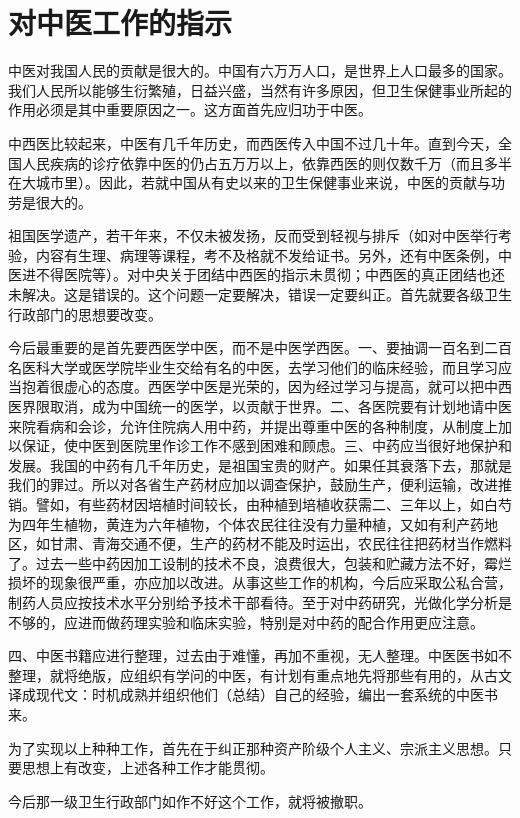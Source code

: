 \section[对中医工作的指示（一九五四年七月三十日）]{对中医工作的指示}


中医对我国人民的贡献是很大的。中国有六万万人口，是世界上人口最多的国家。我们人民所以能够生衍繁殖，日益兴盛，当然有许多原因，但卫生保健事业所起的作用必须是其中重要原因之一。这方面首先应归功于中医。

中西医比较起来，中医有几千年历史，而西医传入中国不过几十年。直到今天，全国人民疾病的诊疗依靠中医的仍占五万万以上，依靠西医的则仅数千万（而且多半在大城市里）。因此，若就中国从有史以来的卫生保健事业来说，中医的贡献与功劳是很大的。

祖国医学遗产，若干年来，不仅未被发扬，反而受到轻视与排斥（如对中医举行考验，内容有生理、病理等课程，考不及格就不发给证书。另外，还有中医条例，中医进不得医院等）。对中央关于团结中西医的指示未贯彻；中西医的真正团结也还未解决。这是错误的。这个问题一定要解决，错误一定要纠正。首先就要各级卫生行政部门的思想要改变。

今后最重要的是首先要西医学中医，而不是中医学西医。一、要抽调一百名到二百名医科大学或医学院毕业生交给有名的中医，去学习他们的临床经验，而且学习应当抱着很虚心的态度。西医学中医是光荣的，因为经过学习与提高，就可以把中西医界限取消，成为中国统一的医学，以贡献于世界。二、各医院要有计划地请中医来院看病和会诊，允许住院病人用中药，并提出尊重中医的各种制度，从制度上加以保证，使中医到医院里作诊工作不感到困难和顾虑。三、中药应当很好地保护和发展。我国的中药有几千年历史，是祖国宝贵的财产。如果任其衰落下去，那就是我们的罪过。所以对各省生产药材应加以调查保护，鼓励生产，便利运输，改进推销。譬如，有些药材因培植时间较长，由种植到培植收获需二、三年以上，如白芍为四年生植物，黄连为六年植物，个体农民往往没有力量种植，又如有利产药地区，如甘肃、青海交通不便，生产的药材不能及时运出，农民往往把药材当作燃料了。过去一些中药因加工设制的技术不良，浪费很大，包装和贮藏方法不好，霉烂损坏的现象很严重，亦应加以改进。从事这些工作的机构，今后应采取公私合营，制药人员应按技术水平分别给予技术干部看待。至于对中药研究，光做化学分析是不够的，应进而做药理实验和临床实验，特别是对中药的配合作用更应注意。

四、中医书籍应进行整理，过去由于难懂，再加不重视，无人整理。中医医书如不整理，就将绝版，应组织有学问的中医，有计划有重点地先将那些有用的，从古文译成现代文：时机成熟并组织他们（总结）自己的经验，编出一套系统的中医书来。

为了实现以上种种工作，首先在于纠正那种资产阶级个人主义、宗派主义思想。只要思想上有改变，上述各种工作才能贯彻。

今后那一级卫生行政部门如作不好这个工作，就将被撤职。


